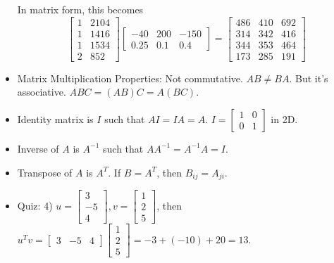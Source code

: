 \documentclass[10pt]{article}
\begin{document}
\begin{itemize}
    In matrix form, this becomes
    \begin{equation*}
      \begin{bmatrix}
        1 & 2104 \\
        1 & 1416 \\
        1 & 1534 \\
        2 & 852 
      \end{bmatrix}
      \begin{bmatrix}
        -40 & 200 & -150 \\
        0.25 & 0.1 & 0.4
      \end{bmatrix}
      =
      \begin{bmatrix}
        486 & 410 & 692 \\
        314 & 342 & 416 \\
        344 & 353 & 464 \\
        173 & 285 & 191
      \end{bmatrix}
    \end{equation*}
  \item Matrix Multiplication Properties: Not commutative. $AB \neq BA$. But it's associative. $ABC = (AB)C = A(BC)$.
  \item Identity matrix is $I$ such that $AI = IA = A$. $I = \begin{bmatrix}1 & 0 \\ 0 & 1\end{bmatrix}$ in 2D.
  \item Inverse of $A$ is $A^{-1}$ such that $AA^{-1} = A^{-1}A = I$.
  \item Transpose of $A$ is $A^{T}$. If $B=A^{T}$, then $B_{ij} = A_{ji}$.
  \item Quiz: 4) $u = \begin{bmatrix}3 \\ -5 \\ 4\end{bmatrix}, v= \begin{bmatrix}1 \\ 2 \\ 5\end{bmatrix}$, then $u^Tv = \begin{bmatrix}3 & -5 & 4\end{bmatrix}\begin{bmatrix}1 \\ 2\\ 5 \end{bmatrix} = -3 + (-10) + 20 = 13$.
\end{itemize}
\hfill \\
\end{document}
